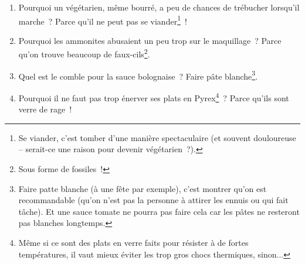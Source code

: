 \documentclass[10pt,a5paper,fullpage]{book}
\begin{document}
\begin{enumerate}
		\item Pourquoi un végétarien, même bourré, a peu de chances de trébucher lorsqu'il marche~? Parce qu'il ne peut pas se viander\footnote{Se viander, c'est tomber d'une manière spectaculaire (et souvent douloureuse -- serait-ce une raison pour devenir végétarien~?).}~!
		\item Pourquoi les ammonites abusaient un peu trop sur le maquillage~? Parce qu'on trouve beaucoup de faux-cils\footnote{Sous forme de fossiles~!}.
		\item Quel est le comble pour la sauce bolognaise~? Faire pâte blanche\footnote{Faire patte blanche (à une fête par exemple), c'est montrer qu'on est recommandable (qu'on n'est pas la personne à attirer les ennuis ou qui fait tâche). Et une sauce tomate ne pourra pas faire cela car les pâtes ne resteront pas blanches longtemps.}.
		\item Pourquoi il ne faut pas trop énerver ses plats en Pyrex\footnote{Même si ce sont des plats en verre faits pour résister à de fortes températures, il vaut mieux éviter les trop gros chocs thermiques, sinon...}~? Parce qu'ils sont verre de rage~!
	\end{enumerate}
	
\end{document}
